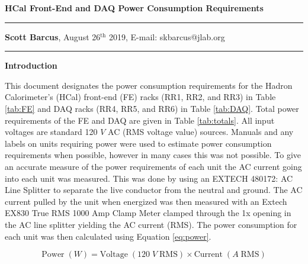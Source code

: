 \documentclass[10pt]{article}
\date{}
\begin{document}
\begin{flushleft}
{\Large
\textbf{HCal Front-End and DAQ Power Consumption Requirements}
}
\\
\vspace{4mm}
\hrule height 0.8pt \relax
\vspace{2mm}
\textbf{Scott Barcus}, August 26$^{\text{th}}$ 2019, E-mail: skbarcus@jlab.org
\end{flushleft}
\vspace{-2mm}
\hrule height 0.8pt \relax
\vspace{6mm}

\setlength{\parindent}{0.5cm}


{\large \noindent \bf{Introduction}}
\vspace{3mm}

This document designates the power consumption requirements for the Hadron Calorimeter's (HCal) front-end (FE) racks (RR1, RR2, and RR3) in Table \ref{tab:FE} and DAQ racks (RR4, RR5, and RR6) in Table \ref{tab:DAQ}. Total power requirements of the FE and DAQ are given in Table \ref{tab:totals}. All input voltages are standard 120 $V$ AC (RMS voltage value) sources. Manuals and any labels on units requiring power were used to estimate power consumption requirements when possible, however in many cases this was not possible. To give an accurate measure of the power requirements of each unit the AC current going into each unit was measured. This was done by using an EXTECH 480172: AC Line Splitter to separate the live conductor from the neutral and ground. The AC current pulled by the unit when energized was then measured with an Extech EX830 True RMS 1000 Amp Clamp Meter clamped through the 1x opening in the AC line splitter yielding the AC current (RMS). The power consumption for each unit was then calculated using Equation \ref{eq:power}.

\begin{equation}\label{eq:power}
	\text{Power} \; (W) = \text{Voltage}\; (120\; V\; \text{RMS}) \times \text{Current}\; (A\; \text{RMS})
\end{equation} 
\end{document}
